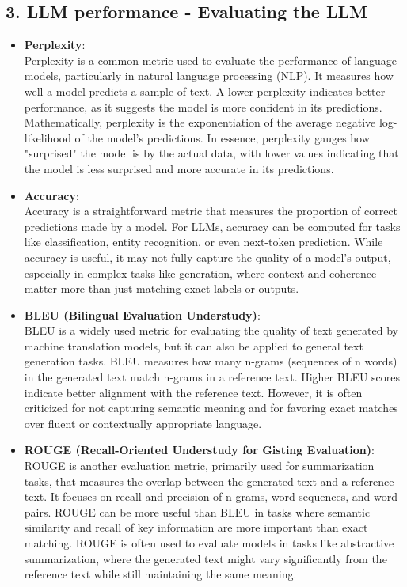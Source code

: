 \documentclass[12pt]{article}
\begin{document}
    \subsection*{3. LLM performance - Evaluating the LLM}
    \begin{itemize}
        \item \textbf{Perplexity}: \\
        Perplexity is a common metric used to evaluate the performance of language models, particularly in natural language processing (NLP). It measures how well a model predicts a sample of text. A lower perplexity indicates better performance, as it suggests the model is more confident in its predictions. Mathematically, perplexity is the exponentiation of the average negative log-likelihood of the model's predictions. In essence, perplexity gauges how "surprised" the model is by the actual data, with lower values indicating that the model is less surprised and more accurate in its predictions.

        \item \textbf{Accuracy}: \\
        Accuracy is a straightforward metric that measures the proportion of correct predictions made by a model. For LLMs, accuracy can be computed for tasks like classification, entity recognition, or even next-token prediction. While accuracy is useful, it may not fully capture the quality of a model's output, especially in complex tasks like generation, where context and coherence matter more than just matching exact labels or outputs.

        \item \textbf{BLEU (Bilingual Evaluation Understudy)}: \\
        BLEU is a widely used metric for evaluating the quality of text generated by machine translation models, but it can also be applied to general text generation tasks. BLEU measures how many n-grams (sequences of n words) in the generated text match n-grams in a reference text. Higher BLEU scores indicate better alignment with the reference text. However, it is often criticized for not capturing semantic meaning and for favoring exact matches over fluent or contextually appropriate language.

        \item \textbf{ROUGE (Recall-Oriented Understudy for Gisting Evaluation)}: \\
        ROUGE is another evaluation metric, primarily used for summarization tasks, that measures the overlap between the generated text and a reference text. It focuses on recall and precision of n-grams, word sequences, and word pairs. ROUGE can be more useful than BLEU in tasks where semantic similarity and recall of key information are more important than exact matching. ROUGE is often used to evaluate models in tasks like abstractive summarization, where the generated text might vary significantly from the reference text while still maintaining the same meaning.


\end{itemize}
\end{document}

